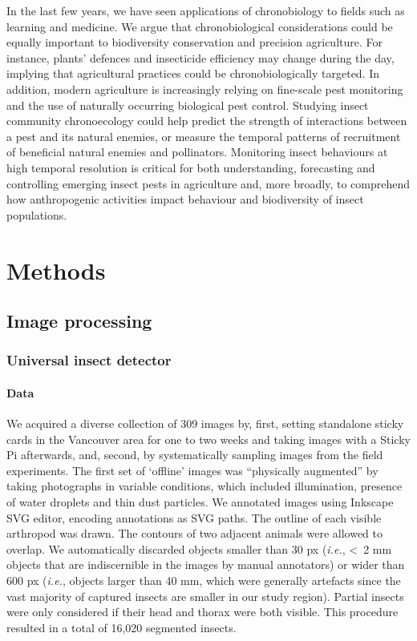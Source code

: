 \documentclass[fleqn,10pt]{wlscirep}
\begin{document}
In the last few years, we have seen applications of chronobiology to fields such as learning\cite{smarr_time_2014} and medicine\cite{cederroth_medicine_2019}. We argue that chronobiological considerations could be equally important to biodiversity conservation and precision agriculture\cite{gottlieb_agro-chronobiology_2019,karapetyan_redox_2018,khyati_insect_2017}. For instance, plants’ defences\cite{goodspeed_arabidopsis_2012,jander_timely_2012} and insecticide efficiency\cite{balmert_time--day_2014,khalid_circadian_2019} may change during the day, implying that agricultural practices could be chronobiologically targeted. In addition, modern agriculture is increasingly relying on fine-scale pest monitoring and the use of naturally occurring biological pest control\cite{gagic_better_2021,tooker_balancing_2020}. Studying insect community chronoecology could help predict the strength of interactions between a pest and its natural enemies, or measure the temporal patterns of recruitment of beneficial natural enemies and pollinators. Monitoring insect behaviours at high temporal resolution is critical for both understanding, forecasting and controlling emerging insect pests in agriculture and, more broadly, to comprehend how anthropogenic activities impact behaviour and biodiversity of insect populations.

\section*{Methods}


\subsection*{Image processing}

\subsubsection*{Universal insect detector}
\paragraph{Data}
We acquired a diverse collection of 309 images by, first, setting standalone sticky cards in the Vancouver area for one to two weeks and taking images with a Sticky Pi afterwards, and, second, by systematically sampling images from the field experiments. The first set of ‘offline’ images was “physically augmented” by taking photographs in variable conditions, which included illumination, presence of water droplets and thin dust particles. We annotated images using Inkscape SVG editor, encoding annotations as SVG paths. The outline of each visible arthropod was drawn. The contours of two adjacent animals were allowed to overlap. We automatically discarded objects smaller than 30 px (\emph{i.e.}, <~2 mm objects that are indiscernible in the images by manual annotators) or wider than 600 px (\emph{i.e.}, objects larger than 40 mm, which were generally artefacts since the vast majority of captured insects are smaller in our study region). Partial insects were only considered if their head and thorax were both visible. This procedure resulted in a total of 16,020 segmented insects.
\end{document}
